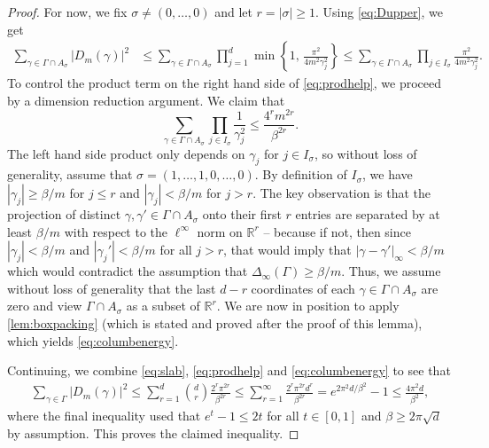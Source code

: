 \documentclass[11pt]{article}
\theoremstyle{definition}
\numberwithin{theorem}{section}
\numberwithin{lemma}{section}
\numberwithin{equation}{section}
\def\R{\mathbb{R}}
\numberwithin{equation}{section}
\begin{document}
\begin{proof}
		For now, we fix $\sigma\ne (0,\dots,0)$ and let $r=|\sigma|\geq 1$. Using \eqref{eq:Dupper}, we get 
		\begin{equation}
			\begin{split}
				\sum_{\gamma\in \Gamma\cap A_\sigma} |D_m(\gamma)|^2
				&\leq \sum_{\gamma\in \Gamma \cap A_\sigma}  \prod_{j=1}^d \min \left\{1, \, \frac{\pi^2}{4m^2 \gamma_j^2} \right\} 
				\leq \sum_{\gamma\in \Gamma \cap A_\sigma}  \prod_{j\in I_{\sigma}} \frac{\pi^2}{4m^2 \gamma_j^2}. 
			\end{split} \label{eq:prodhelp}
		\end{equation}
		To control the product term on the right hand side of \eqref{eq:prodhelp}, we proceed by a dimension reduction argument. We claim that 
		\begin{equation}
			\label{eq:columbenergy}
			\sum_{\gamma\in \Gamma \cap A_\sigma} \prod_{j\in I_{\sigma}} \frac{1}{\gamma_j^2}
			\leq  \frac{4^rm^{2r}}{\beta^{2r}}. 
		\end{equation}
		The left hand side product only depends on $\gamma_j$ for $j\in I_{\sigma}$, so without loss of generality, assume that $\sigma=(1,\dots,1,0,\dots,0)$. By definition of $I_{\sigma}$, we have $|\gamma_j|\geq \beta/m$ for $j\leq r$ and $|\gamma_j|<\beta/m$ for $j>r$. The key observation is that the projection of distinct $\gamma,\gamma'\in \Gamma\cap A_\sigma$ onto their first $r$ entries are separated by at least $\beta/m$ with respect to the $\ell^\infty$ norm on $\R^r$ -- because if not, then since $|\gamma_j|<\beta/m$ and $|\gamma_j'|<\beta/m$ for all $j>r$, that would imply that $|\gamma-\gamma'|_\infty<\beta/m$ which would contradict the assumption that $\Delta_\infty(\Gamma)\geq \beta/m$. Thus, we assume without loss of generality that the last $d-r$ coordinates of each $\gamma\in \Gamma\cap A_\sigma$ are zero and view $\Gamma\cap A_\sigma$ as a subset of $\R^r$. We are now in position to apply \cref{lem:boxpacking} (which is stated and proved after the proof of this lemma), which yields \eqref{eq:columbenergy}. 
		
		Continuing, we combine \eqref{eq:slab}, \eqref{eq:prodhelp} and \eqref{eq:columbenergy} to see that
		\begin{align*}
			\sum_{\gamma\in \Gamma} |D_m(\gamma)|^2
			\leq \sum_{r=1}^d \binom{d}{r} \frac{2^r \pi^{2r}}{\beta^{2r}}
			\leq \sum_{r=1}^\infty \frac{2^r \pi^{2r} d^r}{\beta^{2r}}
			= e^{2\pi^2 d/\beta^2}-1
			\leq \frac{4\pi^2 d}{\beta^2},  
		\end{align*}
		where the final inequality used that $e^t-1\leq 2t$ for all $t\in [0,1]$ and $\beta\geq 2\pi \sqrt d$ by assumption. This proves the claimed inequality.
		

\end{proof}
\end{document}
